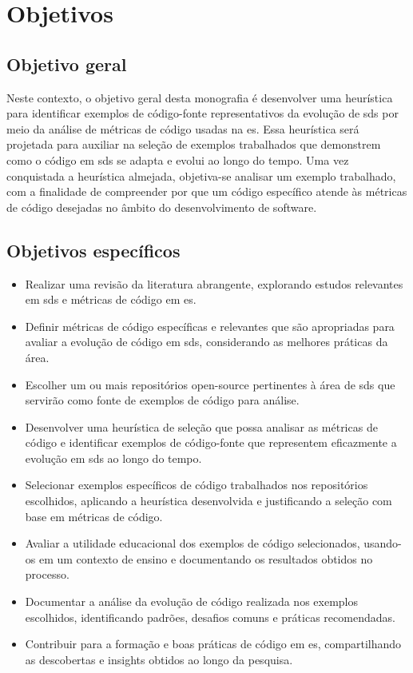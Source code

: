 \section{Objetivos}\label{sec:objetivos}
\subsection{Objetivo geral}\label{subsec:objetivoGeral}
 Neste contexto, o objetivo geral desta monografia é desenvolver uma heurística para identificar exemplos de código-fonte representativos da evolução de \gls{sds} por meio da análise de métricas de código usadas na \gls{es}. Essa heurística será projetada para auxiliar na seleção de exemplos trabalhados que demonstrem como o código em \gls{sds} se adapta e evolui ao longo do tempo. Uma vez conquistada a heurística almejada, objetiva-se analisar um exemplo trabalhado, com a finalidade de compreender por que um código específico atende às métricas de código desejadas no âmbito do desenvolvimento de software.

\subsection{Objetivos específicos}\label{subsec:objetivosEspecificos}
\begin{itemize}
    \item Realizar uma revisão da literatura abrangente, explorando estudos relevantes em \gls{sds} e métricas de código em \gls{es}.
    \item Definir métricas de código específicas e relevantes que são apropriadas para avaliar a evolução de código em \gls{sds}, considerando as melhores práticas da área.
    \item Escolher um ou mais repositórios open-source pertinentes à área de \gls{sds} que servirão como fonte de exemplos de código para análise.
    \item Desenvolver uma heurística de seleção que possa analisar as métricas de código e identificar exemplos de código-fonte que representem eficazmente a evolução em \gls{sds} ao longo do tempo.
    \item Selecionar exemplos específicos de código trabalhados nos repositórios escolhidos, aplicando a heurística desenvolvida e justificando a seleção com base em métricas de código.
    \item Avaliar a utilidade educacional dos exemplos de código selecionados, usando-os em um contexto de ensino e documentando os resultados obtidos no processo.
    \item Documentar a análise da evolução de código realizada nos exemplos escolhidos, identificando padrões, desafios comuns e práticas recomendadas.
    \item Contribuir para a formação e boas práticas de código em \gls{es}, compartilhando as descobertas e insights obtidos ao longo da pesquisa.
\end{itemize}

